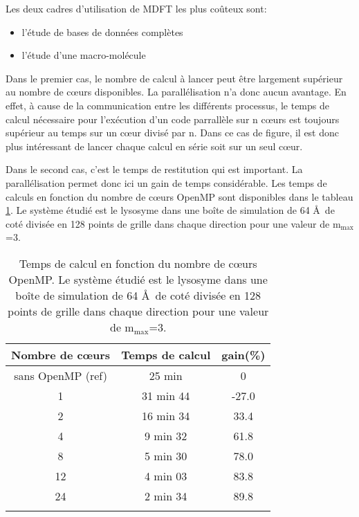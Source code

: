 Les deux cadres d'utilisation de MDFT les plus coûteux sont:
\begin{itemize}
\item l'étude de bases de données complètes
\item l'étude d'une macro-molécule
\end{itemize}

Dans le premier cas, le nombre de calcul à lancer peut être largement supérieur au nombre de cœurs disponibles. La parallélisation n'a donc aucun avantage. En effet, à cause de la communication entre les différents processus, le temps de calcul nécessaire pour l’exécution d'un code parrallèle sur n cœurs est toujours supérieur au temps sur un cœur divisé par n. Dans ce cas de figure, il est donc plus intéressant de lancer chaque calcul en série soit sur un seul cœur.

Dans le second cas, c'est le temps de restitution qui est important. La parallélisation permet donc ici un gain de temps considérable. Les temps de calculs en fonction du nombre de cœurs OpenMP sont disponibles dans le tableau \ref{tab:perf_minimiseurs}. Le système étudié est le lysosyme dans une boîte de simulation de 64 \AA\ de coté divisée en 128 points de grille dans chaque direction pour une valeur de $\mathrm{m}_\mathrm{max}$=3.



\begin{table}[ht]
 \centering
  \begin{tabular}{ c | c | c }
      Nombre de cœurs & Temps de calcul & gain(\%)\\
    \hline
    sans OpenMP (ref) & 25 min & 0\\
     1 & 31 min 44 & -27.0 \\
     2 & 16 min 34 &  33.4 \\
     4 &  9 min 32 &  61.8 \\
     8 &  5 min 30 &  78.0 \\
    12 &  4 min 03 &  83.8 \\
    24 &  2 min 34 &  89.8 \\
    \hline \multicolumn{3}{c}{} \\[-1em]\hline
  \end{tabular}
  \caption[Temps de calcul en fonction du nombre de cœurs OpenMP.]{Temps de calcul en fonction du nombre de cœurs OpenMP. Le système étudié est le lysosyme dans une boîte de simulation de 64 \AA\ de coté divisée en 128 points de grille dans chaque direction pour une valeur de $\mathrm{m}_\mathrm{max}$=3.}
  \label{tab:perf_minimiseurs}  
\end{table}



